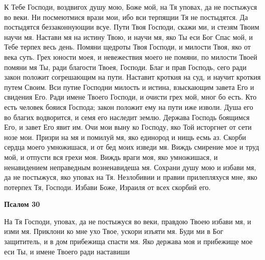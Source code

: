    К Тебе Господи, воздвигох душу мою, Боже мой, на Тя уповах, да не
постыжуся во веки. Ни посмеютмися врази мои, ибо вси терпящии Тя не
постыдятся. Да постыдятся беззаконнующии всуе. Пути Твоя Господи,
скажи ми, и стезям Твоим научи мя. Настави мя на истину Твою, и научи
мя, яко Ты еси Бог Спас мой, и Тебе терпех весь день. Помяни щедроты
Твоя Господи, и милости Твоя, яко от века суть. Грех юности моея, и
невежествия моего не помяни, по милости Твоей помяни мя Ты, ради
благости Твоея, Господи. Благ и прав Господь, сего ради закон положит
согрешающим на пути. Наставит кроткия на суд, и научит кроткия путем
Своим. Вси путие Господни милость и истина, взыскающим завета Его и
свидения Его. Ради имене Твоего Господи, и очисти грех мой, мног бо есть.
Кто есть человек бояися Господа; закон положит ему на пути иже изволи.
Душа его во благих водворится, и семя его наследит землю. Держава
Господь боящимся Его, и завет Его явит им. Очи мои выну ко Господу,
яко Той исторгнет от сети нозе мои. Призри на мя и помилуй мя,
яко единород и нищь есмь аз. Скорби сердца моего умножишася, и
от бед моих изведи мя. Виждь смирение мое и труд мой, и отпусти
вся грехи моя. Виждь враги моя, яко умножишася, и ненавидением
неправедным возненавидеша мя. Сохрани душу мою и избави мя, да не
постыжуся, яко уповах на Тя. Незлобивии и правии прилепляхуся мне,
яко потерпех Тя, Господи. Избави Боже, Израиля от всех скорбий
его.






 

\bfseries Псалом 30\normalfont{}


   На Тя Господи, уповах, да не постыжуся во веки, правдою Твоею
избави мя, и изми мя. Приклони ко мне ухо Твое, ускори изъяти
мя. Буди ми в Бог защититель, и в дом прибежища спасти мя. Яко
держава моя и прибежище мое еси Ты, и имене Твоего ради наставиши

